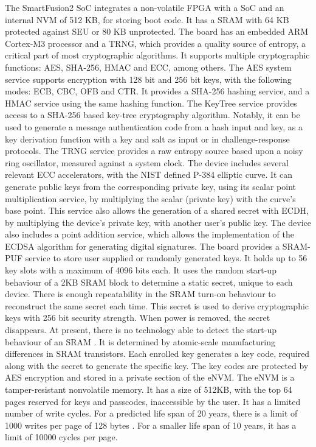 The SmartFusion2 \ac{SoC} integrates a non-volatile \ac{FPGA} with a \ac{SoC} and an internal \ac{NVM} of 512 KB, for storing boot code.
It has a \ac{SRAM} with 64 KB protected against \ac{SEU} or 80 KB unprotected. The board has an embedded ARM Cortex-M3 processor and a \ac{TRNG}, which provides a quality source of entropy, a critical part of most cryptographic algorithms. It supports multiple cryptographic functions: \ac{AES}, \ac{SHA}-256, \ac{HMAC} and \ac{ECC}, among others.
The \ac{AES} system service supports encryption with 128 bit and 256 bit keys, with the following modes: ECB, CBC, OFB and CTR.
It provides a \ac{SHA}-256 hashing service, and a \ac{HMAC} service using the same hashing function.
The KeyTree service provides access to a SHA-256 based key-tree cryptography algorithm. Notably, it can be used to generate a message authentication code from a hash input and key, as a key derivation function with a key and salt as input or in challenge-response protocols.
The \ac{TRNG} service provides a raw entropy source based upon a noisy ring oscillator, measured against a system clock.
The device includes several relevant \ac{ECC} accelerators, with the \ac{NIST} defined P-384 elliptic curve.
It can generate public keys from the corresponding private key, using its scalar point multiplication service, by multiplying the scalar (private key) with the curve's base point. This service also allows the generation of a shared secret with \ac{ECDH}, by multiplying the device's private key, with another user's public key.
The device also includes a point addition service, which allows the implementation of the \ac{ECDSA} algorithm for generating digital signatures.
The board provides a SRAM-PUF service to store user supplied or randomly generated keys.  It holds up to 56 key slots with a maximum of 4096 bits each.
It uses the random start-up behaviour of a 2KB \ac{SRAM} block to determine a static secret, unique to each device. There is enough repeatability in the SRAM turn-on behaviour to reconstruct the same secret each time. This secret is used to derive cryptographic keys with 256 bit security strength.
When power is removed, the secret disappears. At present, there is no technology able to detect the start-up behaviour of an SRAM \cite{smartfusionSecurityPractices}. It is determined by atomic-scale manufacturing differences in SRAM transistors.
Each enrolled key generates a key code, required along with the secret to generate the specific key.
The key codes are protected by \ac{AES} encryption and stored in a private section of the eNVM.
The eNVM is a tamper-resistant nonvolatile memory. It has a size of 512KB, with the top 64 pages reserved for keys and passcodes, inaccessible by the user.
It has a limited number of write cycles. For a predicted life span of 20 years, there is a limit of 1000 writes per page of 128 bytes \cite{smartfusionDatasheet}. For a smaller life span of 10 years, it has a limit of 10000 cycles per page.

